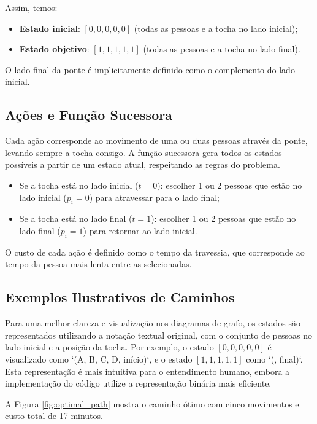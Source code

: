 \documentclass[12pt,a4paper]{article}
\begin{document}
Assim, temos:
\begin{itemize}
    \item \textbf{Estado inicial}: $[0, 0, 0, 0, 0]$ (todas as pessoas e a tocha no lado inicial);
    \item \textbf{Estado objetivo}: $[1, 1, 1, 1, 1]$ (todas as pessoas e a tocha no lado final).
\end{itemize}

O lado final da ponte é implicitamente definido como o complemento do lado inicial.

\subsection{Ações e Função Sucessora}
Cada ação corresponde ao movimento de uma ou duas pessoas através da ponte, levando sempre a tocha consigo. A função sucessora gera todos os estados possíveis a partir de um estado atual, respeitando as regras do problema.

\begin{itemize}
    \item Se a tocha está no lado inicial ($t = 0$): escolher 1 ou 2 pessoas que estão no lado inicial ($p_i = 0$) para atravessar para o lado final;
    \item Se a tocha está no lado final ($t = 1$): escolher 1 ou 2 pessoas que estão no lado final ($p_i = 1$) para retornar ao lado inicial.
\end{itemize}

O custo de cada ação é definido como o tempo da travessia, que corresponde ao tempo da pessoa mais lenta entre as selecionadas.

\subsection{Exemplos Ilustrativos de Caminhos}
Para uma melhor clareza e visualização nos diagramas de grafo, os estados são representados utilizando a notação textual original, com o conjunto de pessoas no lado inicial e a posição da tocha. Por exemplo, o estado $[0, 0, 0, 0, 0]$ é visualizado como `({A, B, C, D}, início)`, e o estado $[1, 1, 1, 1, 1]$ como `({}, final)`. Esta representação é mais intuitiva para o entendimento humano, embora a implementação do código utilize a representação binária mais eficiente.

A Figura \ref{fig:optimal_path} mostra o caminho ótimo com cinco movimentos e custo total de 17 minutos.
\end{document}
